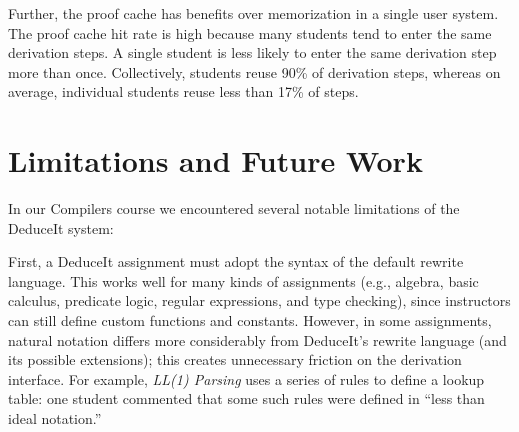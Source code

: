 \documentclass{sigchi}
\begin{document}
Further, the proof cache has benefits over memorization in a single user system. The proof cache hit rate is high because many students tend to enter the same derivation steps. A single student is less likely to enter the same derivation step more than once. Collectively, students reuse 90\% of derivation steps, whereas on average, individual students reuse less than 17\% of steps. 


% 

\section{Limitations and Future Work}

In our Compilers course we encountered several notable limitations of the DeduceIt system: 

First, a DeduceIt assignment must adopt the syntax of the default rewrite language. This works well for many kinds of assignments (e.g., algebra, basic calculus, predicate logic, regular expressions, and type checking), since instructors can still define custom functions and constants. However, in some assignments, natural notation differs more considerably from DeduceIt's rewrite language (and its possible extensions); this creates unnecessary friction on the derivation interface. For example, \textit{LL(1) Parsing} uses a series of rules to define a lookup table: one student commented that some such rules were defined in ``less than ideal notation.'' %
\end{document}
